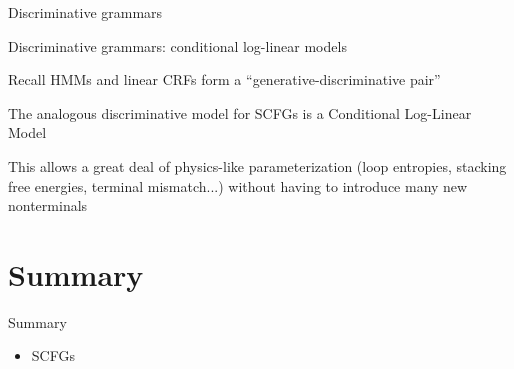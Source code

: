 \documentclass{beamer}
\begin{document}
\begin{frame}{Discriminative grammars}

Discriminative grammars: conditional log-linear models
\itemb
\item Recall HMMs and linear CRFs form a ``generative-discriminative pair''
\item The analogous discriminative model for SCFGs is a Conditional Log-Linear Model
\item This allows a great deal of physics-like parameterization (loop entropies, stacking free energies, terminal mismatch...) without having to introduce many new nonterminals
\iteme

\end{frame}



\section*{Summary}

\begin{frame}{Summary}

  \begin{itemize}
  \item SCFGs
  \end{itemize}

\end{frame}
\end{document}
